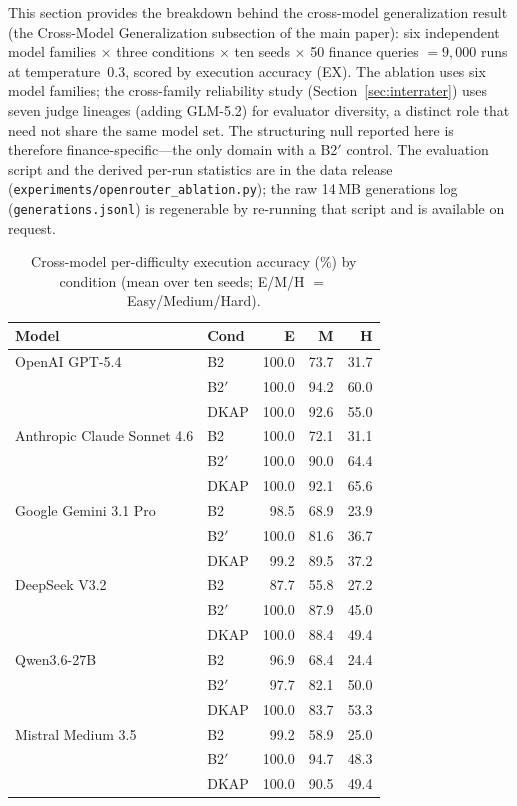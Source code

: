 \documentclass[10pt,a4paper]{article}
\begin{document}
This section provides the breakdown behind the cross-model generalization result (the Cross-Model Generalization subsection of the main paper): six independent model families $\times$ three conditions $\times$ ten seeds $\times$ 50 finance queries $=9{,}000$ runs at temperature~$0.3$, scored by execution accuracy (EX). The ablation uses six model families; the cross-family reliability study (Section~\ref{sec:interrater}) uses seven judge lineages (adding GLM-5.2) for evaluator diversity, a distinct role that need not share the same model set. The structuring null reported here is therefore finance-specific---the only domain with a B2$'$ control. The evaluation script and the derived per-run statistics are in the data release (\texttt{experiments/openrouter\_ablation.py}); the raw 14\,MB generations log (\texttt{generations.jsonl}) is regenerable by re-running that script and is available on request.

\begin{table}[h]
\centering
\caption{Cross-model per-difficulty execution accuracy (\%) by condition (mean over ten seeds; E/M/H $=$ Easy/Medium/Hard).}
\label{tab:crossmodel_diff}
\footnotesize
\begin{tabular}{@{}llrrr@{}}
\toprule
Model & Cond & E & M & H \\
\midrule
OpenAI GPT-5.4 & B2 & 100.0 & 73.7 & 31.7 \\
 & B2$'$ & 100.0 & 94.2 & 60.0 \\
 & DKAP & 100.0 & 92.6 & 55.0 \\
\midrule
Anthropic Claude Sonnet 4.6 & B2 & 100.0 & 72.1 & 31.1 \\
 & B2$'$ & 100.0 & 90.0 & 64.4 \\
 & DKAP & 100.0 & 92.1 & 65.6 \\
\midrule
Google Gemini 3.1 Pro & B2 & 98.5 & 68.9 & 23.9 \\
 & B2$'$ & 100.0 & 81.6 & 36.7 \\
 & DKAP & 99.2 & 89.5 & 37.2 \\
\midrule
DeepSeek V3.2 & B2 & 87.7 & 55.8 & 27.2 \\
 & B2$'$ & 100.0 & 87.9 & 45.0 \\
 & DKAP & 100.0 & 88.4 & 49.4 \\
\midrule
Qwen3.6-27B & B2 & 96.9 & 68.4 & 24.4 \\
 & B2$'$ & 97.7 & 82.1 & 50.0 \\
 & DKAP & 100.0 & 83.7 & 53.3 \\
\midrule
Mistral Medium 3.5 & B2 & 99.2 & 58.9 & 25.0 \\
 & B2$'$ & 100.0 & 94.7 & 48.3 \\
 & DKAP & 100.0 & 90.5 & 49.4 \\
\bottomrule
\end{tabular}
\end{table}
\end{document}
